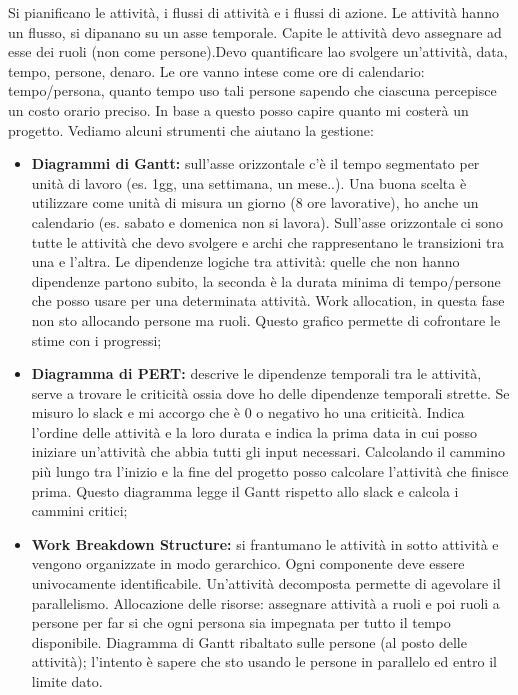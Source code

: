 Si pianificano le attività, i flussi di attività e i flussi di azione. Le attività hanno un flusso, si dipanano su un asse temporale. Capite le attività devo assegnare ad esse dei ruoli (non come persone).Devo quantificare lao svolgere un'attività, data, tempo, persone, denaro. Le ore vanno intese come ore di calendario: tempo/persona, quanto tempo uso tali persone sapendo che ciascuna percepisce un costo orario preciso. In base a questo posso capire quanto mi costerà un progetto. Vediamo alcuni strumenti che aiutano la gestione:
\begin{itemize}
	\item \textbf{Diagrammi di Gantt:} sull'asse orizzontale c'è il tempo segmentato per unità di lavoro (es. 1gg, una settimana, un mese..). Una buona scelta è utilizzare come unità di misura un giorno (8 ore lavorative), ho anche un calendario (es. sabato e domenica non si lavora). Sull'asse orizzontale ci sono tutte le attività che devo svolgere e archi che rappresentano le transizioni tra una e l'altra. Le dipendenze logiche tra attività: quelle che non hanno dipendenze partono subito, la seconda è la durata minima di tempo/persone che posso usare per una determinata attività. Work allocation, in questa fase non sto allocando persone ma ruoli. Questo grafico permette di cofrontare le stime con i progressi;
	\item \textbf{Diagramma di PERT:}  descrive le dipendenze temporali tra le attività, serve a trovare le criticità ossia dove ho delle dipendenze temporali strette. Se misuro lo slack e mi accorgo che è 0 o negativo ho una criticità. Indica l'ordine delle attività e la loro durata e indica la prima data in cui posso iniziare un'attività che abbia tutti gli input necessari. Calcolando il cammino più lungo tra l'inizio e la fine del progetto posso calcolare l'attività che finisce prima. Questo diagramma legge il Gantt rispetto allo slack e calcola i cammini critici;
	\item \textbf{Work Breakdown Structure:} si frantumano le attività in sotto attività e vengono organizzate in modo gerarchico. Ogni componente deve essere univocamente identificabile. Un'attività decomposta permette di agevolare il parallelismo.  Allocazione delle risorse: assegnare attività a ruoli e poi ruoli a persone per far si che ogni persona sia impegnata per tutto il tempo disponibile. Diagramma di Gantt ribaltato sulle persone (al posto delle attività); l'intento è sapere che sto usando le persone in parallelo ed entro il limite dato.
\end{itemize}

